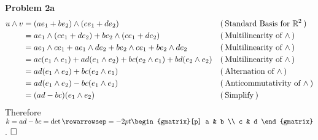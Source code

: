\documentclass[fleqn]{article}
\newcommand{\problem}[1]{\large\textbf{Problem #1}\normalsize}
\newcommand{\evidence}[1]{\ensuremath{(\hspace{0.2em} \text{#1} \hspace{0.2em})}}
\newcommand{\qed}{\hfill\ensuremath{\square}}
\begin{document}
\problem{2a}
\begin{align*}
  u \wedge v
     &= (a e_1 + b e_2) \wedge (c e_1 + d e_2)
     && \evidence{Standard Basis for $\mathbb{R}^2$} \\
  {} &= a e_1 \wedge (c e_1 + d e_2) + be_2 \wedge (c e_1 + d e_2)
     && \evidence{Multilinearity of $\wedge$} \\
  {} &= a e_1 \wedge c e_1 + ae_1 \wedge d e_2 + be_2 \wedge c e_1 + be_2 \wedge d e_2
     && \evidence{Multilinearity of $\wedge$} \\
  {} &= ac(e_1 \wedge e_1) + ad(e_1 \wedge e_2) + bc(e_2 \wedge e_1) + bd(e_2 \wedge e_2)
     && \evidence{Multilinearity of $\wedge$} \\
  {} &= ad(e_1 \wedge e_2) + bc(e_2 \wedge e_1)
     && \evidence{Alternation of $\wedge$} \\
  {} &= ad(e_1 \wedge e_2) - bc(e_1 \wedge e_2)
     && \evidence{Anticommutativity of $\wedge$} \\
  {} &= (ad - bc)(e_1 \wedge e_2)
     && \evidence{Simplify}
\end{align*}
Therefore
$k = ad - bc =
\det{
  \rowarrowsep=-2pt
  \begin{gmatrix}[p]
    a & b \\
    c & d
  \end{gmatrix} 
}
$.
$\qed$ \\
\end{document}
